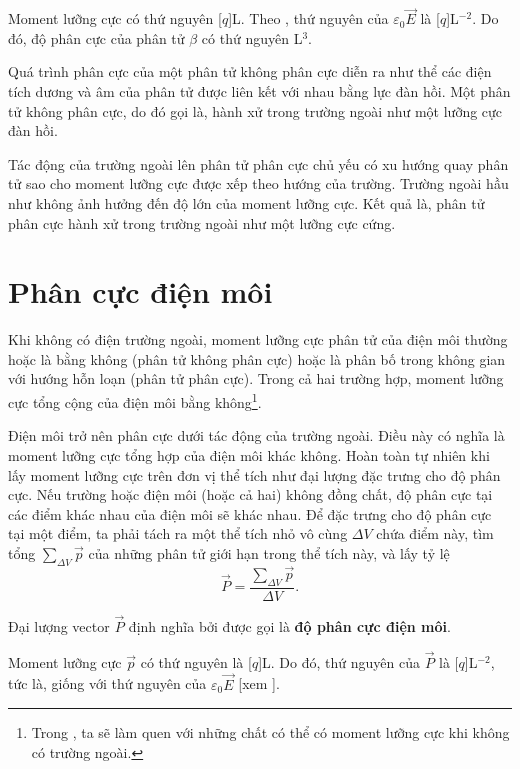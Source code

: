 \noindent
Moment lưỡng cực có thứ nguyên [$q$]L. Theo , thứ nguyên của $\varepsilon_0\vec{E}$ là [$q$]L$^{-2}$. Do đó, độ phân cực của phân tử $\beta$ có thứ nguyên L$^3$.

Quá trình phân cực của một phân tử không phân cực diễn ra như thể các điện tích dương và âm của phân tử được liên kết với nhau bằng lực đàn hồi. Một phân tử không phân cực, do đó gọi là, hành xử trong trường ngoài như một lưỡng cực đàn hồi.

Tác động của trường ngoài lên phân tử phân cực chủ yếu có xu hướng quay phân tử sao cho moment lưỡng cực được xếp theo hướng của trường. Trường ngoài hầu như không ảnh hưởng đến độ lớn của moment lưỡng cực. Kết quả là, phân tử phân cực hành xử trong trường ngoài như một lưỡng cực cứng.

\section{Phân cực điện môi}\label{sec:2_2}

Khi không có điện trường ngoài, moment lưỡng cực phân tử của điện môi thường hoặc là bằng không (phân tử không phân cực) hoặc là phân bố trong không gian với hướng hỗn loạn (phân tử phân cực). Trong cả hai trường hợp, moment lưỡng cực tổng cộng của điện môi bằng không\footnote{Trong , ta sẽ làm quen với những chất có thể có moment lưỡng cực khi không có trường ngoài.}.
    
Điện môi trở nên phân cực dưới tác động của trường ngoài. Điều này có nghĩa là moment lưỡng cực tổng hợp của điện môi khác không. Hoàn toàn tự nhiên khi lấy moment lưỡng cực trên đơn vị thể tích như đại lượng đặc trưng cho độ phân cực. Nếu trường hoặc điện môi (hoặc cả hai) không đồng chất, độ phân cực tại các điểm khác nhau của điện môi sẽ khác nhau. Để đặc trưng cho độ phân cực tại một điểm, ta phải tách ra một thể tích nhỏ vô cùng $\Delta{V}$ chứa điểm này, tìm tổng $\sum_{\Delta{V}}\vec{p}$ của những phân tử giới hạn trong thể tích này, và lấy tỷ lệ
\begin{equation}\label{eq:2_4}
    \vec{P} = \frac{\displaystyle\sum_{\Delta{V}}\vec{p}}{\Delta{V}}.
\end{equation}

\noindent
Đại lượng vector $\vec{P}$ định nghĩa bởi  được gọi là \textbf{độ phân cực điện môi}.

Moment lưỡng cực $\vec{p}$ có thứ nguyên là [$q$]L. Do đó, thứ nguyên của $\vec{P}$ là [$q$]L$^{-2}$, tức là, giống với thứ nguyên của $\varepsilon_0\vec{E}$ [xem ].

